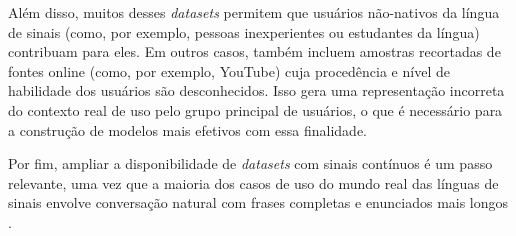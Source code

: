 Além disso, muitos desses \textit{datasets} permitem que usuários não-nativos da língua de sinais (como, por exemplo, pessoas inexperientes ou estudantes da língua) contribuam para eles. Em outros casos, também incluem amostras recortadas de fontes online (como, por exemplo, YouTube) cuja procedência e nível de habilidade dos usuários são desconhecidos. Isso gera uma representação incorreta do contexto real de uso pelo grupo principal de usuários, o que é necessário para a construção de modelos mais efetivos com essa finalidade.

Por fim, ampliar a disponibilidade de \textit{datasets} com sinais contínuos é um passo relevante, uma vez que a maioria dos casos de uso do mundo real das línguas de sinais envolve conversação natural com frases completas e enunciados mais longos \cite{bragg-2019-slr-interdisciplinary}.
















